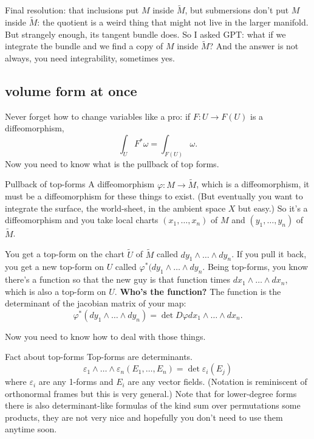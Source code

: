 Final resolution: that inclusions put \(M\) inside \(\widetilde{M}\), but submersions don't put \(M\) inside \(\widetilde{M}\): the quotient is a weird thing that might not live in the larger manifold. But strangely enough, its tangent bundle does. So I asked GPT: what if we integrate the bundle and we find a copy of \(M\) inside \(\widetilde{M}\)? And the answer is not always, you need integrability, sometimes yes.

\subsection{volume form at once}

Never forget how to change variables like a pro: if \(F:U \to F(U)\) is a diffeomorphism,
\[\int_U F^*\omega=\int_{F(U)}\omega.\]
Now you need to know what is the pullback of top forms. 

\begin{thing7}{Pullback of top-forms}\leavevmode
A diffeomorphism \(\varphi:M \to \widetilde M\), which is a diffeomorphism, it must be a diffeomorphism for these things to exist. (But eventually you want to integrate the surface, the world-sheet, in the ambient space \(X\) but easy.) So it's a diffeomorphism and you take local charts \((x_1,\ldots,x_n)\) of \(M\) and \((y_1,\ldots,y_n)\) of \(\widetilde{M}\).

You get a top-form on the chart \(\widetilde{U}\) of \(\widetilde{M}\) called \(dy_1\wedge\ldots \wedge dy_n\). If you pull it back, you get a new top-form on \(U\) called \(\varphi^*(dy_1\wedge\ldots \wedge dy_n\). Being top-forms, you know there's a function so that the new guy is that function times \(dx_1\wedge\ldots\wedge dx_n\), which is also a top-form on \(U\). \textbf{Who's the function?} The function is the determinant of the jacobian matrix of your map:
\[\varphi^*(dy_1\wedge\ldots\wedge dy_n)=\det D\varphi dx_1\wedge\ldots\wedge dx_n.\]
\end{thing7}

Now you need to know how to deal with those things.
\begin{thing7}{Fact about top-forms}\leavevmode
Top-forms are determinants.
\[\varepsilon_1 \wedge \ldots \wedge \varepsilon_n(E_1,\ldots,E_n)=\det \varepsilon_i(E_j)\]
where \(\varepsilon_i\) are any 1-forms and \(E_i\) are any vector fields. (Notation is reminiscent of orthonormal frames but this is very general.) Note that for lower-degree forms there is also determinant-like formulas of the kind sum over permutations some products, they are not very nice and hopefully you don't need to use them anytime soon.
\end{thing7}


